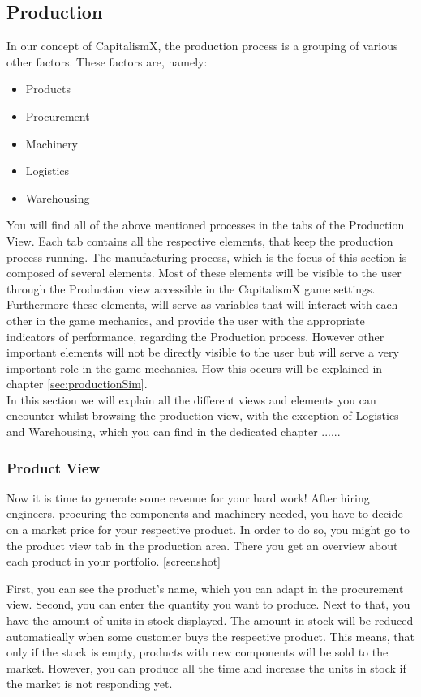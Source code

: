 \subsection{Production}
\label{production_manual}

In our concept of CapitalismX, the production process is a grouping of various other factors. These factors are, namely: 
\begin{itemize} 
\item Products 
\item Procurement  
\item Machinery 
\item Logistics 
\item Warehousing 
\end{itemize}
You will find all of the above mentioned processes in the tabs of the Production View. Each tab contains all the respective elements, that keep the production process running.
The manufacturing process, which is the focus of this section is composed of several elements. Most of these elements will be visible to the user through the Production view accessible in the CapitalismX game settings. Furthermore these elements, will serve as variables that will interact with each other in the game mechanics, and provide the user with the appropriate indicators of performance, regarding the Production process. However other important elements will not be directly visible to the user but will serve a very important role in the game mechanics. How this occurs will be explained in chapter \ref{sec:productionSim}. \\
In this section we will explain all the different views and elements you can encounter whilst browsing the production view, with the exception of Logistics and Warehousing, which you can find in the dedicated chapter ...... \\
\subsubsection{Product View}
\label{sub:ProductView}
Now it is time to generate some revenue for your hard work! After hiring engineers, procuring the components and machinery needed, you have to decide on a market price for your respective product. In order to do so, you might go to the product view tab in the production area. There you get an overview about each product in your portfolio. [screenshot]

First, you can see the product’s name, which you can adapt in the procurement view. Second, you can enter the quantity you want to produce. Next to that, you have the amount of units in stock displayed. The amount in stock will be reduced automatically when some customer buys the respective product. This means, that only if the stock is empty, products with new components will be sold to the market. However, you can produce all the time and increase the units in stock if the market is not responding yet. 

